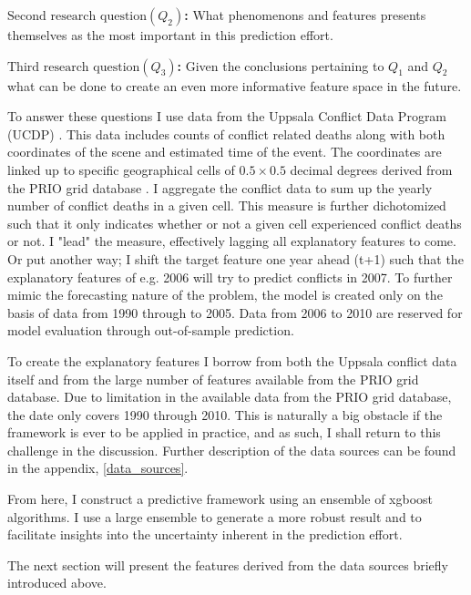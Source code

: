 \documentclass[a4paper]{article}
\begin{document}
\textbf{$\textrm{Second research question} (Q_{2})$:} What phenomenons and features presents themselves as the most important in this prediction effort.\par

\textbf{$\textrm{Third research question} (Q_{3})$:} Given the conclusions pertaining to $Q_1$ and $Q_2$ what can be done to create an even more informative feature space in the future.\par

To answer these questions I use data from the Uppsala Conflict Data Program (UCDP) \citep{Sundberg_2013, Croicu_Sundberg_2017}. This data includes counts of conflict related deaths along with both coordinates of the scene and estimated time of the event. The coordinates are linked up to specific geographical cells of $0.5 \times 0.5$ decimal degrees derived from the PRIO grid database \citep{Tollefsen_2012}. I aggregate the conflict data to sum up the yearly number of conflict deaths in a given cell. This measure is further dichotomized such that it only indicates whether or not a given cell experienced conflict deaths or not. I "lead" the measure, effectively lagging all explanatory features to come. Or put another way; I shift the target feature one year ahead (t+1) such that the explanatory features of e.g. 2006 will try to predict conflicts in 2007. To further mimic the forecasting nature of the problem, the model is created only on the basis of data from 1990 through to 2005. Data from 2006 to 2010 are reserved for model evaluation through out-of-sample prediction.\par

To create the explanatory features I borrow from both the Uppsala conflict data itself and from the large number of features available from the PRIO grid database. Due to limitation in the available data from the PRIO grid database, the date only covers 1990 through 2010. This is naturally a big obstacle if the framework is ever to be applied in practice, and as such, I shall return to this challenge in the discussion. Further description of the data sources can be found in the appendix, \autoref{data_sources}.\par

From here, I construct a predictive framework using an ensemble of xgboost algorithms. I use a large ensemble to generate a more robust result and to facilitate insights into the uncertainty inherent in the prediction effort.\par

The next section will present the features derived from the data sources briefly introduced above.\par
\end{document}
